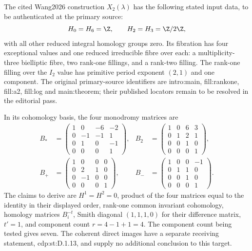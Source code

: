 
The cited Wang2026 construction $X_2(\lambda)$ has the following
stated input data, to be authenticated at the primary source:
\[
H_0=H_6=\Z,\qquad H_2=H_3=\Z/2\Z,
\]
with all other reduced integral homology groups zero. Its fibration
has four exceptional values and one reduced irreducible fibre over
each: a multiplicity-three bielliptic fibre, two rank-one fillings,
and a rank-two filling. The rank-one filling over the $I_2$ value has
primitive period exponent $(2,1)$ and one component.
The original primary-source identifiers are intro:main, fill:rankone,
fill:a2, fill:log and main:theorem; their published locators remain to
be resolved in the editorial pass.

In its cohomology basis, the four monodromy matrices are
\[
\begin{aligned}
B_*&=\begin{pmatrix}1&0&-6&-2\\0&-1&-1&1\\0&1&0&-1\\0&0&0&1\end{pmatrix},&
B_2&=\begin{pmatrix}1&0&6&3\\0&1&2&1\\0&0&1&0\\0&0&0&1\end{pmatrix},\\
B_+&=\begin{pmatrix}1&0&0&0\\0&2&1&0\\0&-1&0&0\\0&0&0&1\end{pmatrix},&
B_-&=\begin{pmatrix}1&0&0&-1\\0&1&1&0\\0&0&1&0\\0&0&0&1\end{pmatrix}.
\end{aligned}
\]
The claims to derive are $H^1=H^2=0$, product of the four matrices
equal to the identity in their displayed order, rank-one common
invariant cohomology, homology matrices $B_i^{-t}$, Smith diagonal
$(1,1,1,0)$ for their difference matrix, $t'=1$, and component count
$r=4-1+1=4$. The component count being tested gives seven.
The coherent direct images have a separate receiving statement,
cdp:st:D.1.13, and supply no additional conclusion to this target.
